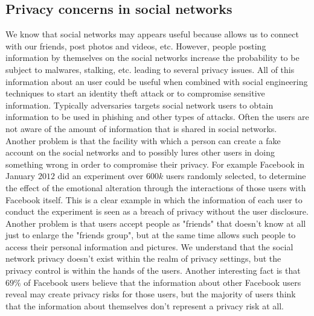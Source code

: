 \subsection{Privacy concerns in social networks}
We know that social networks may appears useful because allows us to connect with our friends, post photos and videos, etc. However, people posting information by themselves on the social networks increase the probability to be subject to malwares, stalking, etc. leading to several privacy issues. All of this information about an user could be useful when combined with social engineering techniques to start an identity theft attack or to compromise sensitive information. Typically adversaries targets social network users to obtain information to be used in phishing and other types of attacks. Often the users are not aware of the amount of information that is shared in social networks. Another problem is that the facility with which a person can create a fake account on the social networks and to possibly lures other users in doing something wrong in order to compromise their privacy. For example Facebook in January $2012$ did an experiment over $600k$ users randomly selected, to determine the effect of the emotional alteration through the interactions of those users with Facebook itself. This is a clear example in which the information of each user to conduct the experiment is seen as a breach of privacy without the user disclosure. Another problem is that users accept people as "friends" that doesn't know at all just to enlarge the "friends group", but at the same time allows such people to access their personal information and pictures. We understand that the social network privacy doesn't exist within the realm of privacy settings, but the privacy control is within the hands of the users. Another interesting fact is that $69 \%$ of Facebook users believe that the information about other Facebook users reveal may create privacy risks for those users, but the majority of users think that the information about themselves don't represent a privacy risk at all.